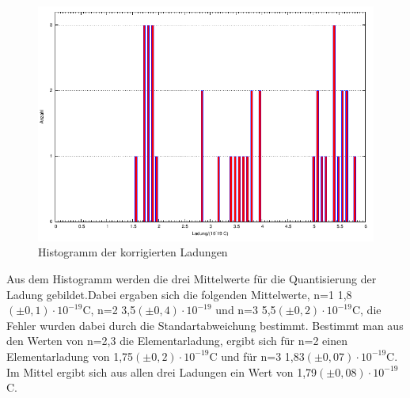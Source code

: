 \documentclass[12pt]{scrartcl}
\begin{document}
\begin{figure}[H] 
  \centering
    \includegraphics[scale = 0.7]{messung.pdf}
  	\caption[Histogramm der korrigierten Ladungen]{Histogramm der korrigierten Ladungen}
  \label{fig:histogramm}
\end{figure}

Aus dem Histogramm werden die drei Mittelwerte für die Quantisierung der Ladung gebildet.Dabei ergaben sich die folgenden Mittelwerte, n=1 \hspace*{4px} 1,8$(\pm0,1)\cdot 10^{-19}$C, n=2 \hspace*{4px} 3,5$(\pm 0,4)\cdot 10^{-19}$ und n=3 \hspace*{4px} 5,5$(\pm 0,2)\cdot 10^{-19}$C, die Fehler wurden dabei durch die Standartabweichung bestimmt. Bestimmt man aus den Werten von n=2,3 die Elementarladung, ergibt sich für n=2 einen Elementarladung von 1,75$(\pm 0,2)\cdot 10^{-19}$C und für n=3 \hspace*{4px} 1,83$(\pm 0,07)\cdot 10^{-19}$C.
Im Mittel ergibt sich aus allen drei Ladungen ein Wert von 1,79$(\pm 0,08)\cdot 10^{-19}$C.
\end{document}
